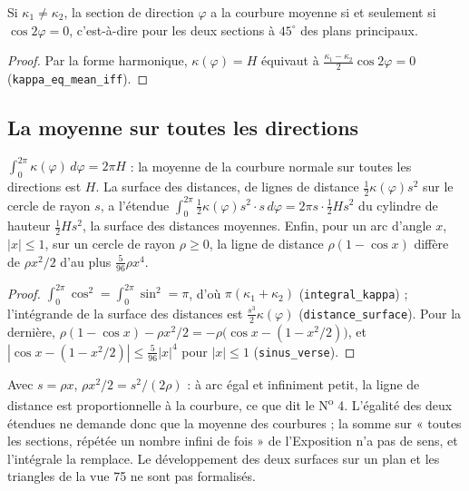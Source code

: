 \begin{enonce}
Si $\kappa_1 \neq \kappa_2$, la section de direction $\varphi$ a la courbure moyenne si et seulement si $\cos 2\varphi = 0$, c'est-à-dire pour les deux sections à $45^\circ$ des plans principaux.
\end{enonce}

\begin{proof}
Par la forme harmonique, $\kappa(\varphi) = H$ équivaut à $\frac{\kappa_1 - \kappa_2}2\cos 2\varphi = 0$ (\texttt{kappa\_eq\_mean\_iff}).
\end{proof}

\subsection*{La moyenne sur toutes les directions}

\begin{enonce}
$\int_0^{2\pi}\kappa(\varphi)\,d\varphi = 2\pi H$ : la moyenne de la courbure normale sur toutes les directions est $H$. La surface des distances, de lignes de distance $\frac12\kappa(\varphi)s^2$ sur le cercle de rayon $s$, a l'étendue $\int_0^{2\pi}\frac12\kappa(\varphi)s^2\cdot s\,d\varphi = 2\pi s\cdot\frac12 Hs^2$ du cylindre de hauteur $\frac12 Hs^2$, la surface des distances moyennes. Enfin, pour un arc d'angle $x$, $|x| \leq 1$, sur un cercle de rayon $\rho \geq 0$, la ligne de distance $\rho(1 - \cos x)$ diffère de $\rho x^2/2$ d'au plus $\frac5{96}\rho x^4$.
\end{enonce}

\begin{proof}
$\int_0^{2\pi}\cos^2 = \int_0^{2\pi}\sin^2 = \pi$, d'où $\pi(\kappa_1 + \kappa_2)$ (\texttt{integral\_kappa}) ; l'intégrande de la surface des distances est $\frac{s^3}2\kappa(\varphi)$ (\texttt{distance\_surface}). Pour la dernière, $\rho(1 - \cos x) - \rho x^2/2 = -\rho\bigl(\cos x - (1 - x^2/2)\bigr)$, et $|\cos x - (1 - x^2/2)| \leq \frac5{96}|x|^4$ pour $|x| \leq 1$ (\texttt{sinus\_verse}).
\end{proof}

\begin{remarque}
Avec $s = \rho x$, $\rho x^2/2 = s^2/(2\rho)$ : à arc égal et infiniment petit, la ligne de distance est proportionnelle à la courbure, ce que dit le N\textsuperscript{o} 4. L'égalité des deux étendues ne demande donc que la moyenne des courbures ; la somme sur « toutes les sections, répétée un nombre infini de fois » de l'Exposition n'a pas de sens, et l'intégrale la remplace. Le développement des deux surfaces sur un plan et les triangles de la vue 75 ne sont pas formalisés.
\end{remarque}

